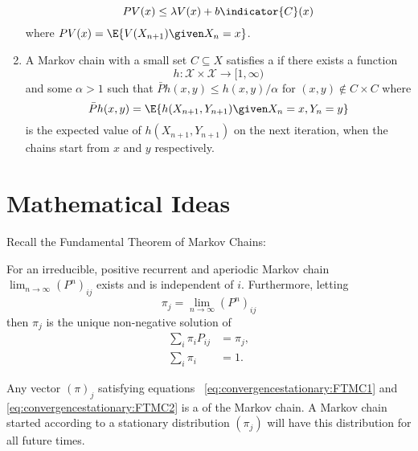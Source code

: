 \documentclass[12pt]{article}
\begin{document}
\begin{enumerate}
\[            PV(x) \le \lambda V(x) + b \indicator{C}(x)
        \] where \( PV(x) = \E{V(X_{n+1}) \given X_n = x} \).
    \item
        A Markov chain with a small set \( C \subseteq X \) satisfies a
         if there exists a function
        \[
            h :  \mathcal{X} \times \mathcal{X} \to [1, \infty)
        \] and some \( \alpha > 1 \) such that \( \bar{P}h(x,y) \le h(x,y)/\alpha
        \) for \( (x,y) \notin C \times C \) where
        \[
            \bar{P}h(x,y)= \E{h(X_{n+1}, Y_{n+1}) \given X_n = x, Y_n =
            y}
        \] is the expected value of \( h(X_{n+1}, Y_{n+1}) \) on the
        next iteration, when the chains start from \( x \) and \( y \)
        respectively.
\end{enumerate}

\hr

\section*{Mathematical Ideas}

Recall the Fundamental Theorem of Markov Chains:

\begin{theorem}
    For an irreducible, positive recurrent and aperiodic Markov chain \(
    \lim_{n \to \infty} (P^n)_{ij} \) exists and is independent of \( i \).
    Furthermore, letting
    \[
        \pi_j = \lim_{n \to \infty} (P^n)_{ij}
    \] then \( \pi_j \) is the unique non-negative solution of
    \begin{align}
        \sum\limits_{i} \pi_{i} P_{ij} &= \pi_{j},%
        \label{eq:convergencestationary:FTMC1}\\
        \sum\limits_{i} \pi_{i} &= 1.%
        \label{eq:convergencestationary:FTMC2}
    \end{align}
\end{theorem}

\begin{definition}
    Any vector \( (\pi)_{j} \) satisfying equations~%
    \ref{eq:convergencestationary:FTMC1} and~%
    \ref{eq:convergencestationary:FTMC2} is a %
    of the Markov chain.  A Markov chain started according to a
    stationary distribution \( (\pi_j) \) will have this distribution
    for all future times.
\end{definition}
\end{document}
